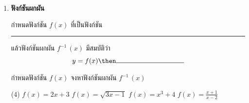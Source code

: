 \begin{enumerate}
กำหนดฟังก์ชัน $f(x)$ และ $g(x)$ แล้วฟังก์ชันประกอบนิยามด้วย
\[ (f \circ g) (x) =  \rule{100pt}{.5pt} \]

กำหนด $f(x)$ และ $g(x)$ มาให้ในแต่ละข้อ จงหา $(f \circ g)(x)$ และ $(g \circ f)(x)$
\begin{tasks}(3)
\task $f(x) = 3x, g(x) = x^2$
\vspace{150pt}
\task $f(x) = x^3,  g(x) = 2x-1$
\task $f(x) = x^2+1, g(x) = x^2-1$
\end{tasks}
จงใช้ $(f \circ g)(x)$ และ $(g \circ f)(x)$ ที่หามาได้ข้างบน เพื่อหา $(f \circ g)(0)$ และ $(f \circ g)(1)$
\vspace{100pt}

\item \textbf{ฟังก์ชันผกผัน} 

กำหนดฟังก์ชัน $f(x)$ ที่เป็นฟังก์ชัน \rule{100pt}{.5pt} แล้วฟังก์ชันผกผัน $f^{-1}\,(x)$ มีสมบัติว่า
\[y = f(x) \then \rule{100pt}{.5pt}\]

กำหนดฟังก์ชัน $f(x)$ จงหาฟังก์ชันผกผัน $f^{-1}\,(x)$
\begin{tasks}(4)
\task $f(x) = 2x+3$
\vspace{100pt}
\task $f(x) = \sqrt{3x-1}$
\task $f(x) = x^3+4$
\task $f(x) = \frac{x+1}{x-2}$
\end{tasks}



\end{enumerate}
